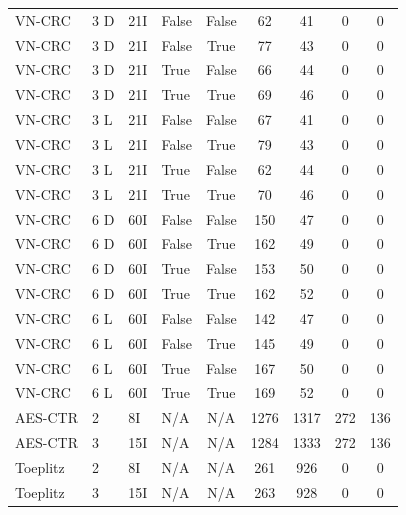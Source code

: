 \begin{table}[H]
\begin{tabular}{llllccccc}
    VN-CRC   & 3 D & 21I  & False & False & 62    & 41   & 0   & 0 \\
    VN-CRC   & 3 D & 21I  & False & True  & 77    & 43   & 0   & 0 \\
    VN-CRC   & 3 D & 21I  & True  & False & 66    & 44   & 0   & 0 \\
    VN-CRC   & 3 D & 21I  & True  & True  & 69    & 46   & 0   & 0 \\
    VN-CRC   & 3 L & 21I  & False & False & 67    & 41   & 0   & 0 \\
    VN-CRC   & 3 L & 21I  & False & True  & 79    & 43   & 0   & 0 \\
    VN-CRC   & 3 L & 21I  & True  & False & 62    & 44   & 0   & 0 \\
    VN-CRC   & 3 L & 21I  & True  & True  & 70    & 46   & 0   & 0 \\
    VN-CRC   & 6 D & 60I  & False & False & 150   & 47   & 0   & 0 \\
    VN-CRC   & 6 D & 60I  & False & True  & 162   & 49   & 0   & 0 \\
    VN-CRC   & 6 D & 60I  & True  & False & 153   & 50   & 0   & 0 \\
    VN-CRC   & 6 D & 60I  & True  & True  & 162   & 52   & 0   & 0 \\
    VN-CRC   & 6 L & 60I  & False & False & 142   & 47   & 0   & 0 \\
    VN-CRC   & 6 L & 60I  & False & True  & 145   & 49   & 0   & 0 \\
    VN-CRC   & 6 L & 60I  & True  & False & 167   & 50   & 0   & 0 \\
    VN-CRC   & 6 L & 60I  & True  & True  & 169   & 52   & 0   & 0 \\
    AES-CTR  & 2 & 8I    & N/A   & N/A   & 1276  & 1317 & 272 & 136 \\
    AES-CTR  & 3 & 15I   & N/A   & N/A   & 1284  & 1333 & 272 & 136 \\
    Toeplitz & 2 & 8I    & N/A   & N/A   & 261   & 926  & 0   & 0 \\
    Toeplitz & 3 & 15I   & N/A   & N/A   & 263   & 928  & 0   & 0 \\
    \hline
  \end{tabular}


\end{table}
